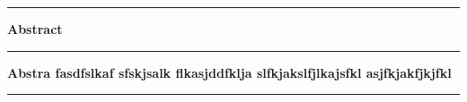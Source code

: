 

\onecolumn
\begin{table*}[hbt!]\centering
  \vskip50pt
  \parbox[h]{.75\textwidth}{\centering \hrule height 2pt \vskip10pt\Large \textbf{Abstract} \vskip10pt \hrule height 2pt \vskip10pt}
  \parbox[h]{.75\textwidth}{\normalsize \textbf{
       Abstra fasdfslkaf sfskjsalk flkasjddfklja slfkjakslfjlkajsfkl asjfkjakfjkjfkl 
} \vskip10pt \hrule height 2pt \vskip10pt}
\end{table*}
\clearpage
\begin{table*}[hbt!]\centering
\vskip20pt
\parbox[h]{.75\textwidth}{\tableofcontents}
\end{table*}
\clearpage
\twocolumn
